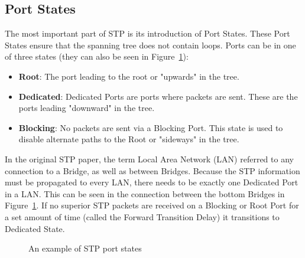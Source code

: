 \subsection*{Port States}
The most important part of STP is its introduction of Port States.
These Port States ensure that the spanning tree does not contain loops.
Ports can be in one of three states (they can also be seen in Figure~\ref{fig:port_states}):
\begin{itemize}
    \item \textbf{Root}: The port leading to the root or "upwards" in the tree.
    \item \textbf{Dedicated}: Dedicated Ports are ports where packets are sent. These are the ports leading "downward" in the tree.
    \item \textbf{Blocking}: No packets are sent via a Blocking Port.
        This state is used to disable alternate paths to the Root or "sideways" in the tree.
\end{itemize}
In the original STP paper, the term Local Area Network (LAN) referred to any connection to a Bridge, as well as between Bridges.
Because the STP information must be propagated to every LAN, there needs to be exactly one Dedicated Port in a LAN.
This can be seen in the connection between the bottom Bridges in Figure~\ref{fig:port_states}.
If no superior STP packets are received on a Blocking or Root Port for a set amount of time (called the Forward Transition Delay) it transitions to Dedicated State.
\begin{figure}[h]
    \centering
    \caption{An example of STP port states}
    \label{fig:port_states}
\end{figure}


